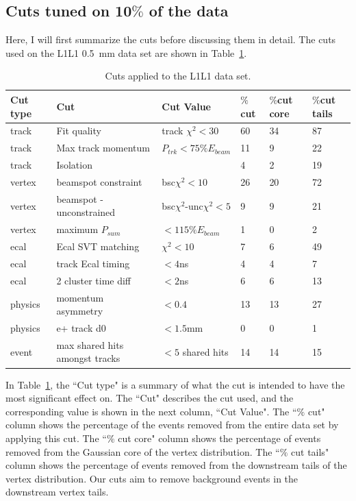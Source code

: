 \subsection{Cuts tuned on 10$\%$ of the data}
Here, I will first summarize the cuts before discussing them in detail. The cuts used on the L1L1 0.5~mm data set are shown in Table~\ref{tab:l1l1_cuts}.
\begin{table}[htb]
\caption{Cuts applied to the L1L1 data set.}
\label{tab:l1l1_cuts}
\centering
\begin{tabular}{llllll}
\toprule
Cut type & Cut & Cut Value &  $\%$cut &  $\%$cut core & $\%$cut tails\\
\midrule
track & Fit quality & track $\chi^{2}<30$ & 60 & 34 & 87 \\
track & Max track momentum &  $P_{trk}<75\%E_{beam}$ & 11 & 9 & 22 \\
track & Isolation &   & 4 & 2 & 19 \\
vertex & beamspot constraint & bsc$\chi^{2}<10$  & 26 & 20 & 72 \\
vertex & beamspot - unconstrained & bsc$\chi^{2}$-unc$\chi^2<5$  & 9 & 9 & 21 \\
vertex & maximum $P_{sum}$ &  $<115\%E_{beam}$ & 1 & 0 & 2 \\
ecal & Ecal SVT matching & $\chi^2<10$  & 7 & 6 & 49 \\
ecal & track Ecal timing & $<4$ns  & 4 & 4 & 7 \\
ecal & 2 cluster time diff & $<2$ns  & 6 & 6 & 13 \\
physics & momentum asymmetry & $<0.4$  & 13 & 13 & 27 \\
physics & e+ track d0 & $<1.5$mm  & 0 & 0 & 1 \\
event & max shared hits amongst tracks & $<5$ shared hits  & 14 & 14 & 15 \\
\bottomrule
\end{tabular}
\end{table}
In Table~\ref{tab:l1l1_cuts}, the ``Cut type" is a summary of what the cut is intended to have the most significant effect on. The ``Cut" describes the cut used, and the corresponding value is shown in the next column, ``Cut Value". The ``$\%$ cut" column shows the percentage of the  events removed from the entire data set by applying this cut. The ``$\%$ cut core" column shows the percentage of events removed from the Gaussian core of the vertex distribution. The ``$\%$ cut tails" column shows the percentage of events removed from the downstream tails of the vertex distribution. Our cuts aim to remove background events in the downstream vertex tails.\\
